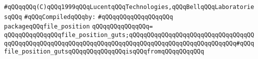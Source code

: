 \label{src/lib/std/file-position.pkg}
\verb|#qQQqqQQq(C)qQQq1999qQQqLucentqQQqTechnologies,qQQqBellqQQqLaboratoriesqQQq|\newline
\newline
\verb|#qQQqCompiledqQQqby:|\newline
\verb|#qQQqqQQqqQQqqQQqqQQq|\newline
\newline
\verb|packageqQQqfile_position|\newline
\verb|qQQqqQQqqQQqqQQq=|\newline
\verb|qQQqqQQqqQQqqQQqfile_position_guts;qQQqqQQqqQQqqQQqqQQqqQQqqQQqqQQqqQQqqQQqqQQqqQQqqQQqqQQqqQQqqQQqqQQqqQQqqQQqqQQqqQQqqQQqqQQqqQQqqQQq#qQQqfile_position_gutsqQQqqQQqqQQqqQQqisqQQqfromqQQqqQQqqQQq|\newline

